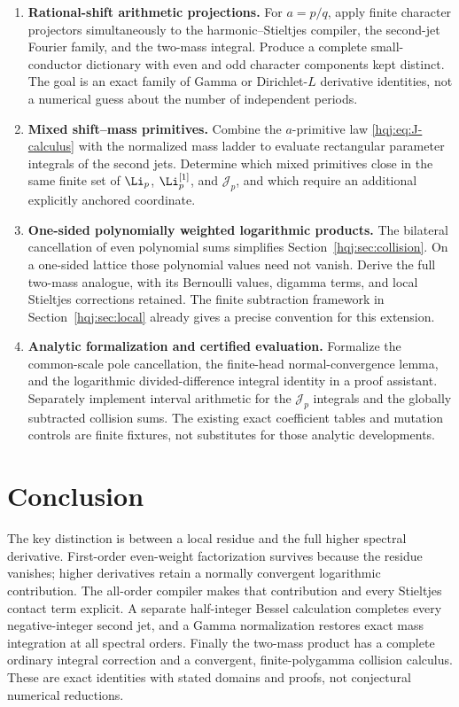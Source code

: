 \begin{enumerate}
\item \textbf{Rational-shift arithmetic projections.}
For $a=p/q$, apply finite character projectors simultaneously to the
harmonic--Stieltjes compiler, the second-jet Fourier family, and the
two-mass integral. Produce a complete small-conductor dictionary
with even and odd character components kept distinct. The goal is
an exact family of Gamma or Dirichlet-$L$ derivative identities,
not a numerical guess about the number of independent periods.

\item \textbf{Mixed shift--mass primitives.}
Combine the $a$-primitive law \eqref{hqj:eq:J-calculus} with the
normalized mass ladder to evaluate rectangular parameter integrals
of the second jets. Determine which mixed primitives close in the
same finite set of $\Li_p$, $\Li_p^{[1]}$, and $\mathcal J_p$, and
which require an additional explicitly anchored coordinate.

\item \textbf{One-sided polynomially weighted logarithmic products.}
The bilateral cancellation of even polynomial sums simplifies
Section~\ref{hqj:sec:collision}. On a one-sided lattice those
polynomial values need not vanish. Derive the full two-mass
analogue, with its Bernoulli values, digamma terms, and local
Stieltjes corrections retained. The finite subtraction framework
in Section~\ref{hqj:sec:local} already gives a precise convention
for this extension.

\item \textbf{Analytic formalization and certified evaluation.}
Formalize the common-scale pole cancellation, the finite-head
normal-convergence lemma, and the logarithmic divided-difference
integral identity in a proof assistant. Separately implement interval
arithmetic for the $\mathcal J_p$ integrals and the globally
subtracted collision sums. The existing exact coefficient tables
and mutation controls are finite fixtures, not substitutes for those
analytic developments.
\end{enumerate}

\section*{Conclusion}
The key distinction is between a local residue and the full higher
spectral derivative. First-order even-weight factorization survives
because the residue vanishes; higher derivatives retain a normally
convergent logarithmic contribution. The all-order compiler makes that
contribution and every Stieltjes contact term explicit. A separate
half-integer Bessel calculation completes every negative-integer second
jet, and a Gamma normalization restores exact mass integration at all
spectral orders. Finally the two-mass product has a complete ordinary
integral correction and a convergent, finite-polygamma collision
calculus. These are exact identities with stated domains and proofs,
not conjectural numerical reductions.
